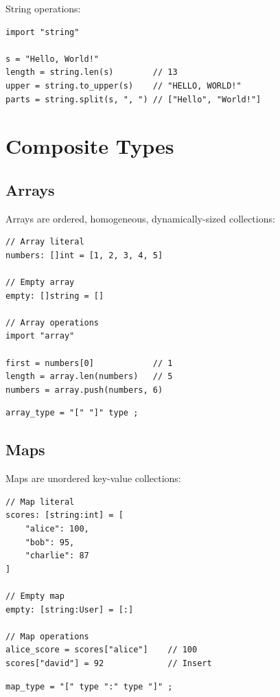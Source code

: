 String operations:
\begin{lstlisting}
import "string"

s = "Hello, World!"
length = string.len(s)        // 13
upper = string.to_upper(s)    // "HELLO, WORLD!"
parts = string.split(s, ", ") // ["Hello", "World!"]
\end{lstlisting}

\section{Composite Types}

\subsection{Arrays}

Arrays are ordered, homogeneous, dynamically-sized collections:

\begin{lstlisting}
// Array literal
numbers: []int = [1, 2, 3, 4, 5]

// Empty array
empty: []string = []

// Array operations
import "array"

first = numbers[0]            // 1
length = array.len(numbers)   // 5
numbers = array.push(numbers, 6)
\end{lstlisting}

\begin{lstlisting}[language=EBNF]
array_type = "[" "]" type ;
\end{lstlisting}

\subsection{Maps}

Maps are unordered key-value collections:

\begin{lstlisting}
// Map literal
scores: [string:int] = [
    "alice": 100,
    "bob": 95,
    "charlie": 87
]

// Empty map
empty: [string:User] = [:]

// Map operations
alice_score = scores["alice"]    // 100
scores["david"] = 92             // Insert
\end{lstlisting}

\begin{lstlisting}[language=EBNF]
map_type = "[" type ":" type "]" ;
\end{lstlisting}

